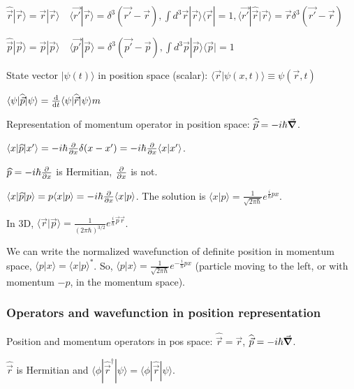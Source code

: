 $\widehat{\vec{r}} | \vec{r} \rangle = \vec{r} | \vec{r} \rangle \quad \langle \vec{r'} | \vec{r} \rangle = \delta^3 (\vec{r'} - \vec{r}), \int d^3 \vec{r} |\vec{r} \rangle \langle \vec{r} | = 1, \langle \vec{r'} | \hat{\vec{r}} | \vec{r} \rangle = \vec{r} \delta^3(\vec{r'} - \vec{r})$

$\widehat{\vec{p}} | \vec{p} \rangle = \vec{p} | \vec{p} \rangle \quad \langle \vec{p'} | \vec{p} \rangle = \delta^3(\vec{p'} - \vec{p}), \int d^3 \vec{p} | \vec{p} \rangle \langle \vec{p} | = 1$

State vector $| \psi(t) \rangle$ in position space (scalar): $\langle \vec{r} | \psi(x, t) \rangle \equiv \psi(\vec{r}, t)$

$\langle \psi | \widehat{\vec{p}} | \psi \rangle = \dv{}{t} \langle \psi | \widehat{\vec{r}} | \psi \rangle m$

Representation of momentum operator in position space: $\widehat{\vec{p}} = -i \hbar \vec{\grad}$.

$\langle x | \widehat{p} | x' \rangle = -i \hbar \pdv{}{x} \delta(x - x') = -i \hbar \pdv{}{x} \langle x | x' \rangle$.

$\widehat{p} = -i \hbar \pdv{}{x}$ is Hermitian, $\pdv{}{x}$ is not.

$\langle x | \widehat{p} | p \rangle = p \langle x | p \rangle = -i \hbar \pdv{}{x} \langle x | p \rangle$. The solution is $\langle x | p \rangle = \frac{1}{\sqrt{2 \pi \hbar}} e^{\frac{i}{\hbar} px}$. 

In 3D, $\langle \vec{r} | \vec{p} \rangle = \frac{1}{(2 \pi \hbar)^{3/2}} e^{\frac{i}{\hbar} \vec{p} \vec{r}}$.

We can write the normalized wavefunction of definite position in momentum space, $\langle p | x \rangle = \langle x | p \rangle^*$. So, $\langle p | x \rangle = \frac{1}{\sqrt{2 \pi \hbar}} e^{-\frac{i}{\hbar} px}$ (particle moving to the left, or with momentum $-p$, in the momentum space).

\subsubsection{Operators and wavefunction in position representation}

Position and momentum operators in pos space: $\widehat{\vec{r}} = \vec{r}$, $\widehat{\vec{p}} = -i \hbar \vec{\grad}$.

$\widehat{\vec{r}}$ is Hermitian and $\langle \phi | \widehat{\vec{r}}^{\dag} | \psi \rangle = \langle \phi | \widehat{\vec{r}} | \psi \rangle$.

